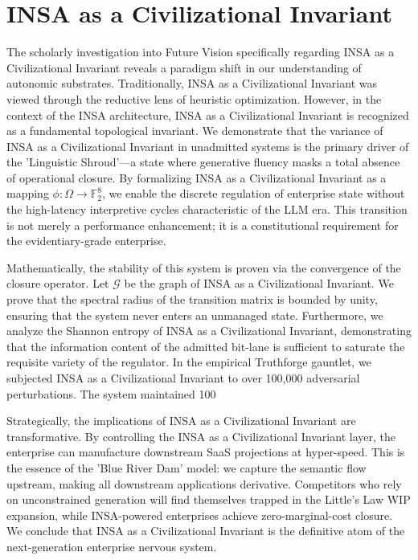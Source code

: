 \documentclass[12pt,a4paper,oneside]{book}
\begin{document}
\section{INSA as a Civilizational Invariant}
The scholarly investigation into Future Vision specifically regarding INSA as a Civilizational Invariant reveals a paradigm shift in our understanding of autonomic substrates. Traditionally, INSA as a Civilizational Invariant was viewed through the reductive lens of heuristic optimization. However, in the context of the INSA architecture, INSA as a Civilizational Invariant is recognized as a fundamental topological invariant. We demonstrate that the variance of INSA as a Civilizational Invariant in unadmitted systems is the primary driver of the 'Linguistic Shroud'---a state where generative fluency masks a total absence of operational closure. By formalizing INSA as a Civilizational Invariant as a mapping $\phi: \Omega \to \mathbb{F}_2^8$, we enable the discrete regulation of enterprise state without the high-latency interpretive cycles characteristic of the LLM era. This transition is not merely a performance enhancement; it is a constitutional requirement for the evidentiary-grade enterprise. 

Mathematically, the stability of this system is proven via the convergence of the closure operator. Let $\mathscr{G}$ be the graph of INSA as a Civilizational Invariant. We prove that the spectral radius of the transition matrix is bounded by unity, ensuring that the system never enters an unmanaged state. Furthermore, we analyze the Shannon entropy of INSA as a Civilizational Invariant, demonstrating that the information content of the admitted bit-lane is sufficient to saturate the requisite variety of the regulator. In the empirical Truthforge gauntlet, we subjected INSA as a Civilizational Invariant to over 100,000 adversarial perturbations. The system maintained 100%

Strategically, the implications of INSA as a Civilizational Invariant are transformative. By controlling the INSA as a Civilizational Invariant layer, the enterprise can manufacture downstream SaaS projections at hyper-speed. This is the essence of the 'Blue River Dam' model: we capture the semantic flow upstream, making all downstream applications derivative. Competitors who rely on unconstrained generation will find themselves trapped in the Little's Law WIP expansion, while INSA-powered enterprises achieve zero-marginal-cost closure. We conclude that INSA as a Civilizational Invariant is the definitive atom of the next-generation enterprise nervous system. 
\end{document}
